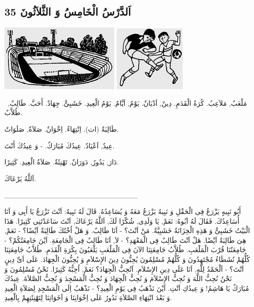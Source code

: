 \documentclass[a5paper]{article}
\begin{document}
\subsection{اَلدَّرْسُ الْخَامِسُ وَ الثَّلاَثُونَ 35}
 \includegraphics[width=2.3437in,height=1.3126in]{images/MuhammadBagauddinprettified-img082.png}   \includegraphics[width=1.4063in,height=1.2917in]{images/MuhammadBagauddinprettified-img083.png} 

\ مَلْعَبٌ, مَلاَعِبُ. كُرَةُ الْقَدَمِ. دِينٌ, اَدْيَانٌ. يَوْمٌ, اَيَّامٌ. يَوْمُ الْعِيدِ. خَشَبِىٌّ. جِهَادٌ. أَحَبَّ. طَالِبٌ, طُلاَّبٌ. 

طَالِبَةٌ (ات). اِنْتِهَاءٌ. اِخْوَانٌ. صَلاَةٌ, صَلَوَاتٌ. 

عِيدٌ, اَعْيَادٌ. عِيدُكَ مُبَارَكٌ. - وَ عِيدُكَ أَنْتَ. 

دَارَ, يَدُورُ, دَوَرَانٌ. تَهْنِئَةٌ. صَلاَةُ الْعِيدِ. كَثِيرًا.

اَللَّهُ يَرْعَاكَ.

\_\_\_\_\_\_\_\_\_\_\_\_\_\_\_\_\_\_\_\_\_\_\_\_\_\_

أَبُو نَبِيهٍ يَزْرَعُ فِى الْحَقْلِ وَ نَبِيهٌ يَزْرَعُ مَعَهُ وَ يُسَاعِدُهُ. قَالَ لَهُ نَبِيهٌ: اَنْتَ تَزْرَعُ يَا أَبِى وَ اَنَا أُسَاعِدُكَ. فَقَالَ لَهُ اَبُوهُ: نَعَمْ, يَا وَلَدِى, شُكْرًا لَكَ, اَللَّهُ يَرْعَاكَ, اَنْتَ سَاعَدْتَنِى كَثِيرًا. هَذَا الْبَيْتُ خَشَبِىٌّ وَ هَذِهِ الْخِزَانَةُ خَشَبِيَّةٌ. مَنْ اَنْتَ؟ - اَنَا طَالِبٌ. وَ هَلْ اُخْتُكَ طَالِبَةٌ اَيْضًا؟ - نَعَمْ, هِىَ طَالِبَةٌ اَيْضًا. هَلْ اَنْتَ طَالِبٌ فِى الْمَعْهَدِ؟ - لاَ, اَنَا طَالِبٌ فِى الْجَامِعَةِ. اَيْنَ جَامِعَتُكُمْ؟ - جَامِعَتُنَا قُرْبَ الْمَلْعَبِ. طُلاَّبُ جَامِعَتِنَا الآنَ فِى الْمَلْعَبِ يَلْعَبُونَ بِكُرَةِ الْقَدَمِ. طُلاَّبُ جَامِعَتِنَا كُلُّهُمْ نُشَطَاءُ مُجْتَهِدُونَ وَ كُلُّهُمْ مُسْلِمُونَ يُحِبُّونَ دِينَ الإِسْلاَمِ وَ يُحِبُّونَ الْجِهَادَ. عَلَى اَىِّ دِينٍ اَنْتَ؟ - اَلْحَمْدُ لِلَّهِ, اَنَا عَلَى دِينِ الإِسْلاَمِ. اَتُحِبُّ الْجِهَادَ؟ نَعَمْ, اُحِبُّهُ كَثِيرًا. نَحْنُ مُسْلِمُونَ وَ نَحْنُ نُحِبُّ اللَّهَ وَ نُحِبُّ الإِسْلاَمَ وَ نُحِبُّ الْجِهَادَ وَ نُحِبُّ الْمَسْجِدَ وَ نُحِبُّ الصَّلاَةَ. عِيدُكَ مُبَارَكٌ يَا هَاشِمُ! وَ عِيدُكِ اَنْتِ. اَيْنَ نَذْهَبُ فِى يَوْمِ الْعِيدِ؟ - نَذْهَبُ اِلَى الْمَسْجِدِ لِصَلاَةِ الْعِيدِ وَ بَعْدَ انْتِهَاءِ الصَّلاَةِ نَدُورُ عَلَى اِخْوَانِنَا وَ اَخَوَاتِنَا لِتَهْنِئَتِهِمْ بِالْعِيدِ.
\end{document}
